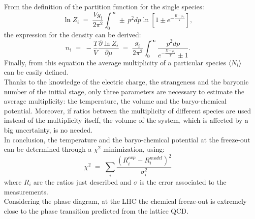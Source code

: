 From the definition of the partition function for the single species:
\begin{equation}
 \ln Z_{i}\; = \; \frac{Vg_{i}}{2\pi^{2}}\int_{0}^{\infty}\pm\:p^{2}dp\ln[1\pm e^{-\frac{E-\mu_{i}}{T}}],
\end{equation}
the expression for the density can be derived:
\begin{equation}
n_{i}\; = \; -\frac{T}{V} \frac{\partial \ln Z_{i}}{\partial \mu} \;=\; \frac{g_{i}}{2\pi^{2}} \int_{0}^{\infty}\frac{p^{2}dp}{e^{-\frac{E-\mu_{i}}{T}}\pm1}.
\end{equation}
Finally, from this equation the average multiplicity of a particular species $\langle N_{i} \rangle$ can be easily defined.\\
Thanks to the knowledge of the electric charge, the strangeness and the baryonic number of the initial stage, only three parameters are necessary to estimate the average multiplicity: the temperature, the volume and the baryo-chemical potential. Moreover, if ratios between the multiplicity of different species are used instead of the multiplicity itself, the volume of the system, which is affected by a big uncertainty, is no needed.\\
In conclusion, the temperature and the baryo-chemical potential at the freeze-out can be determined through a $\chi^{2}$ minimization, using:
\begin{equation}
 \chi^{2}\;=\;\sum_{i}\frac{(R_{i}^{exp}-R_{i}^{model})^{2}}{\sigma_{i}^{2}}
\end{equation}
where $R_{i}$ are the ratios just described and $\sigma$ is the error associated to the measurements.\\
Considering the phase diagram, at the LHC the chemical freeze-out is extremely close to the phase transition predicted from the lattice QCD.
%
